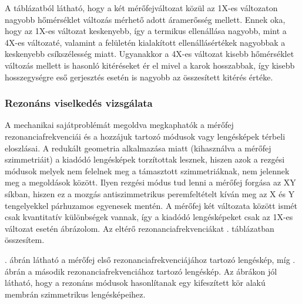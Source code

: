 A táblázatból látható, hogy a két mérőfejváltozat közül az 1X-es változaton nagyobb hőmérséklet változás mérhető adott áramerősség mellett. Ennek oka, hogy az 1X-es változat keskenyebb, így a termikus ellenállása nagyobb, mint a 4X-es változaté, valamint a felületén kialakított ellenállásértékek nagyobbak a keskenyebb csíkszélesség miatt. Ugyanakkor a 4X-es változat kisebb hőmérséklet változás mellett is hasonló kitéréseket ér el mivel a karok hosszabbak, így kisebb hosszegységre eső gerjesztés esetén is nagyobb az összesített kitérés értéke.

\subsubsection{Rezonáns viselkedés vizsgálata}

A mechanikai sajátproblémát megoldva megkaphatók a mérőfej rezonanciafrekvenciái és a hozzájuk tartozó módusok vagy lengésképek térbeli eloszlásai. A redukált geometria alkalmazása miatt (kihasználva a mérőfej szimmetriáit) a kiadódó lengésképek torzítottak lesznek, hiszen azok a rezgési módusok melyek nem felelnek meg a támasztott szimmetriáknak, nem jelennek meg a megoldások között. Ilyen rezgési módus tud lenni a mérőfej forgása az XY síkban, hiszen ez a mozgás antiszimmetrikus peremfeltételt kíván meg az X és Y tengelyekkel párhuzamos egyenesek mentén. A mérőfej két változata között ismét csak kvantitatív különbségek vannak, így a kiadódó lengésképeket csak az 1X-es változat esetén ábrázolom. Az eltérő rezonanciafrekvenciákat . táblázatban összesítem.


. ábrán látható a mérőfej első rezonanciafrekvenciájához tartozó lengéskép, míg . ábrán a második rezonanciafrekvenciához tartozó lengéskép. Az ábrákon jól látható, hogy a rezonáns módusok hasonlítanak egy kifeszített kör alakú membrán szimmetrikus lengésképeihez\cite{bessel}.

